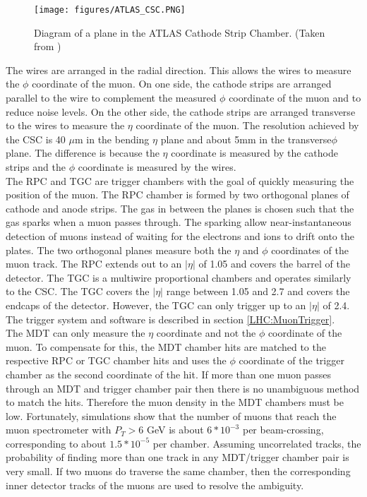 \begin{figure}[h!]
\centering
\texttt{[image: figures/ATLAS\_CSC.PNG]}
\caption{ Diagram of a plane in the ATLAS Cathode Strip Chamber. (Taken from \cite{biblio:JINST}) \label{LHC:fig:ATLASCSC}}
\end{figure}

\indent The wires are arranged in the radial direction. This allows the wires to measure the $\phi$ coordinate of the muon. On one side, the cathode strips are arranged parallel to the wire to complement the measured $\phi$ coordinate of the muon and to reduce noise levels. On the other side, the cathode strips are arranged transverse to the wires to measure the $\eta$ coordinate of the muon. The resolution achieved by the CSC is 40 $\mu$m in the bending $\eta$ plane and about 5mm in the transverse$\phi$ plane. The difference is because the $\eta$ coordinate is measured by the cathode strips and the $\phi$ coordinate is measured by the wires. \cite{biblio:JINST} ~\\
\indent The RPC and TGC are trigger chambers with the goal of quickly measuring the position of the muon. The RPC chamber is formed by two orthogonal planes of cathode and anode strips. The gas in between the planes is chosen such that the gas sparks when a muon passes through. The sparking allow near-instantaneous detection of muons instead of waiting for the electrons and ions to drift onto the plates. The two orthogonal planes measure both the $\eta$ and $\phi$ coordinates of the muon track. The RPC extends out to an $|\eta|$ of 1.05 and covers the barrel of the detector. The TGC is a multiwire proportional chambers and operates similarly to the CSC. The TGC covers the $|\eta|$ range between 1.05 and 2.7 and covers the endcaps of the detector. However, the TGC can only trigger up to an $|\eta|$ of 2.4. The trigger system and software is described in section \ref{LHC:MuonTrigger}. ~\\
\indent The MDT can only measure the $\eta$ coordinate and not the $\phi$ coordinate of the muon. To compensate for this, the MDT chamber hits are matched to the respective RPC or TGC chamber hits and uses the $\phi$ coordinate of the trigger chamber as the second coordinate of the hit. If more than one muon passes through an MDT and trigger chamber pair then there is no unambiguous method to match the hits. Therefore the muon density in the MDT chambers must be low. Fortunately, simulations show that the number of muons that reach the muon spectrometer with $P_T > 6$ GeV is about $6*10^{-3}$ per beam-crossing, corresponding to about $1.5*10^{-5}$ per chamber.\cite{biblio:JINST} Assuming uncorrelated tracks, the probability of finding more than one track in any MDT/trigger chamber pair is very small. \cite{biblio:JINST} If two muons do traverse the same chamber, then the corresponding inner detector tracks of the muons are used to resolve the ambiguity. ~\\
